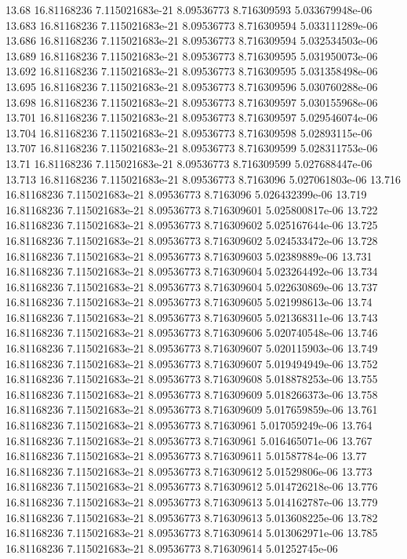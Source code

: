 {13.68 16.81168236 7.115021683e-21 8.09536773 8.716309593 5.033679948e-06
13.683 16.81168236 7.115021683e-21 8.09536773 8.716309594 5.033111289e-06
13.686 16.81168236 7.115021683e-21 8.09536773 8.716309594 5.032534503e-06
13.689 16.81168236 7.115021683e-21 8.09536773 8.716309595 5.031950073e-06
13.692 16.81168236 7.115021683e-21 8.09536773 8.716309595 5.031358498e-06
13.695 16.81168236 7.115021683e-21 8.09536773 8.716309596 5.030760288e-06
13.698 16.81168236 7.115021683e-21 8.09536773 8.716309597 5.030155968e-06
13.701 16.81168236 7.115021683e-21 8.09536773 8.716309597 5.029546074e-06
13.704 16.81168236 7.115021683e-21 8.09536773 8.716309598 5.02893115e-06
13.707 16.81168236 7.115021683e-21 8.09536773 8.716309599 5.028311753e-06
13.71 16.81168236 7.115021683e-21 8.09536773 8.716309599 5.027688447e-06
13.713 16.81168236 7.115021683e-21 8.09536773 8.7163096 5.027061803e-06
13.716 16.81168236 7.115021683e-21 8.09536773 8.7163096 5.026432399e-06
13.719 16.81168236 7.115021683e-21 8.09536773 8.716309601 5.025800817e-06
13.722 16.81168236 7.115021683e-21 8.09536773 8.716309602 5.025167644e-06
13.725 16.81168236 7.115021683e-21 8.09536773 8.716309602 5.024533472e-06
13.728 16.81168236 7.115021683e-21 8.09536773 8.716309603 5.02389889e-06
13.731 16.81168236 7.115021683e-21 8.09536773 8.716309604 5.023264492e-06
13.734 16.81168236 7.115021683e-21 8.09536773 8.716309604 5.022630869e-06
13.737 16.81168236 7.115021683e-21 8.09536773 8.716309605 5.021998613e-06
13.74 16.81168236 7.115021683e-21 8.09536773 8.716309605 5.021368311e-06
13.743 16.81168236 7.115021683e-21 8.09536773 8.716309606 5.020740548e-06
13.746 16.81168236 7.115021683e-21 8.09536773 8.716309607 5.020115903e-06
13.749 16.81168236 7.115021683e-21 8.09536773 8.716309607 5.019494949e-06
13.752 16.81168236 7.115021683e-21 8.09536773 8.716309608 5.018878253e-06
13.755 16.81168236 7.115021683e-21 8.09536773 8.716309609 5.018266373e-06
13.758 16.81168236 7.115021683e-21 8.09536773 8.716309609 5.017659859e-06
13.761 16.81168236 7.115021683e-21 8.09536773 8.71630961 5.017059249e-06
13.764 16.81168236 7.115021683e-21 8.09536773 8.71630961 5.016465071e-06
13.767 16.81168236 7.115021683e-21 8.09536773 8.716309611 5.01587784e-06
13.77 16.81168236 7.115021683e-21 8.09536773 8.716309612 5.01529806e-06
13.773 16.81168236 7.115021683e-21 8.09536773 8.716309612 5.014726218e-06
13.776 16.81168236 7.115021683e-21 8.09536773 8.716309613 5.014162787e-06
13.779 16.81168236 7.115021683e-21 8.09536773 8.716309613 5.013608225e-06
13.782 16.81168236 7.115021683e-21 8.09536773 8.716309614 5.013062971e-06
13.785 16.81168236 7.115021683e-21 8.09536773 8.716309614 5.01252745e-06
}
